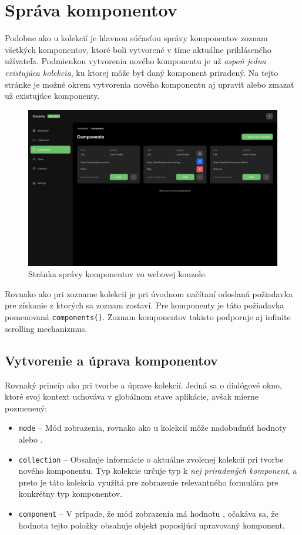 \section{Správa komponentov}
Podobne ako u kolekcií je hlavnou súčasťou správy komponentov zoznam všetkých komponentov, ktoré boli vytvorené v tíme aktuálne prihláseného užívateľa. Podmienkou vytvorenia nového komponentu je už \emph{aspoň jedna existujúca kolekcia}, ku ktorej môže byť daný komponent priradený. Na tejto stránke je možné okrem vytvorenia nového komponentu aj upraviť alebo zmazať už existujúce komponenty.

\begin{figure}[h]
	\centering
	\includegraphics[scale=0.085]{obrazky-figures/screenshot_components}
	\caption{Stránka správy komponentov vo webovej konzole.}
\end{figure}

\noindent Rovnako ako pri zozname kolekcií je pri úvodnom načítaní odoslaná požiadavka pre získanie z ktorých sa zoznam zostaví. Pre komponenty je táto požiadavka pomenovaná \texttt{components()}. Zoznam komponentov takisto podporuje aj infinite scrolling mechanizmus.

\subsection{Vytvorenie a úprava komponentov}
Rovnaký princíp ako pri tvorbe a úprave kolekcií. Jedná sa o dialógové okno, ktoré svoj kontext uchováva v globálnom stave aplikácie, avšak mierne pozmenený:

\begin{itemize}
	\item \texttt{mode} -- Mód zobrazenia, rovnako ako u kolekcií môže nadobudnúť hodnoty  alebo .
	\item \texttt{collection} -- Obsahuje informácie o aktuálne zvolenej kolekcií pri tvorbe nového komponentu. Typ kolekcie určuje typ k \emph{nej priradených komponent}, a preto je táto kolekcia využitá pre zobrazenie relevantného formulára pre konkrétny typ komponentov.
	\item \texttt{component} -- V prípade, že mód zobrazenia má hodnotu , očakáva sa, že hodnota tejto položky obsahuje objekt poposijúci upravovaný komponent.
\end{itemize}

